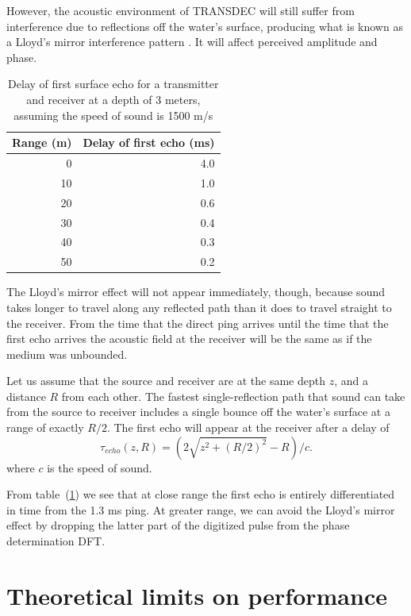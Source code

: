 \documentclass[10pt]{article}
\begin{document}
However, the acoustic environment of TRANSDEC will still suffer from interference due to reflections off the water's surface, producing what is known as a Lloyd's mirror interference pattern \cite{Etter}.  It will affect perceived amplitude and phase.

\begin{table}[htdp]
\caption{Delay of first surface echo for a transmitter and receiver at a depth of 3 meters, assuming the speed of sound is 1500 m/s}
\begin{center}
\begin{tabular}{|r|r|}
\hline
Range (m) & Delay of first echo (ms) \\
\hline
 0	& 4.0 \\
 10	& 1.0 \\
 20	& 0.6 \\
 30	& 0.4 \\
 40	& 0.3 \\
 50	& 0.2 \\
 \hline
\end{tabular}
\end{center}
\label{tab:lloyd}
\end{table}

The Lloyd's mirror effect will not appear immediately, though, because sound takes longer to travel along any reflected path than it does to travel straight to the receiver.  From the time that the direct ping arrives until the time that the first echo arrives the acoustic field at the receiver will be the same as if the medium was unbounded.

Let us assume that the source and receiver are at the same depth \(z\), and a distance \(R\) from each other.  The fastest single-reflection path that sound can take from the source to receiver includes a single bounce off the water's surface at a range of exactly \(R/2\).  The first echo will appear at the receiver after a delay of
\begin{equation}
\tau_{echo}(z,R)=(2\sqrt{z^2+(R/2)^2}-R)/c.
\end{equation}
where \(c\) is the speed of sound.

From table~(\ref{tab:lloyd}) we see that at close range the first echo is entirely differentiated in time from the 1.3 ms ping.  At greater range, we can avoid the Lloyd's mirror effect by dropping the latter part of the digitized pulse from the phase determination DFT.

\section{Theoretical limits on performance}
\end{document}
